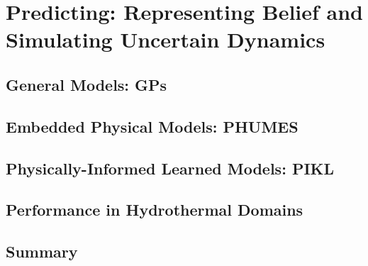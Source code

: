 \chapter{Predicting: Representing Belief and Simulating Uncertain Dynamics}

\section{General Models: GPs}

\section{Embedded Physical Models: PHUMES}

\section{Physically-Informed Learned Models: PIKL}

\section{Performance in Hydrothermal Domains}

\section{Summary}